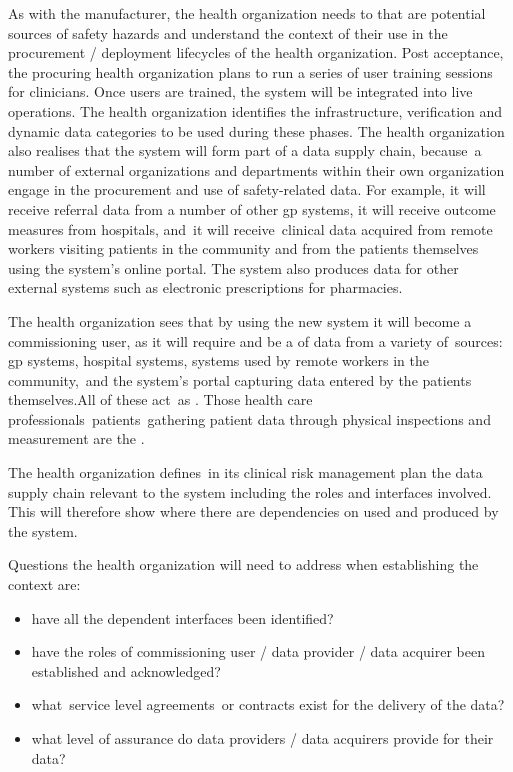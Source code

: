 As with the manufacturer, the health organization needs to  that are potential sources of safety hazards and understand the context of their use in the procurement / deployment lifecycles of the health organization.
Post acceptance, the procuring health organization plans to run a series of user training sessions for clinicians.
Once users are trained, the system will be integrated into live operations.
The health organization identifies the infrastructure,
\gls{verification} and dynamic data categories to be used
during these phases.
The health organization also realises that the system will form part of a data supply chain\cbstart, because\cbend\ a number of external organizations and departments within their own organization engage in the procurement and use of safety-related data.
For example, it will receive referral data from a number of other \gls{gp} systems, it will receive outcome measures from hospitals, and\cbstart\ it will receive\cbend\ clinical data acquired from remote workers visiting patients in the community and from the patients themselves using the system's online portal.
The system also produces data for other external systems such as electronic prescriptions for pharmacies.

The health organization sees that by using the new system it will become a commissioning user, as it will require and be a  of data from a variety of\cbstart\ sources: \gls{gp} systems, hospital systems, systems used by remote workers in the community,\cbend\ and the system's portal capturing data entered by the patients themselves.\cbstart All of these act\cbend\ as . Those health care professionals\cbstart\ patients\cbend\ gathering patient data through physical inspections and measurement are the .

The health organization defines\cbstart\ in its clinical risk management plan the data supply chain relevant to the system including the roles and interfaces involved\cbend. This will therefore show where there are dependencies on  used and produced by the system.

Questions the health organization will need to address when establishing the context are:
\begin{itemize}
  \item have all the dependent interfaces been identified?
  \item have the roles of commissioning user / data provider / data acquirer been established and acknowledged?
  \item what\cbstart\ service level agreements\cbend\ or contracts exist for the delivery of the data?
  \item what level of assurance do data providers / data acquirers provide for their data?
\end{itemize}

